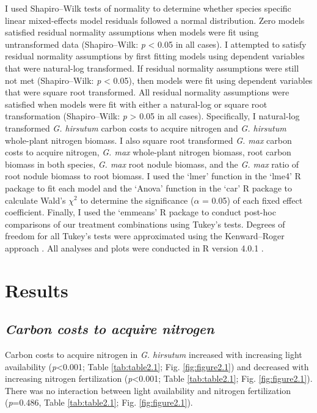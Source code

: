 I used Shapiro–Wilk tests of normality to determine whether species specific linear mixed-effects model residuals followed a normal distribution. Zero models satisfied residual normality assumptions when models were fit using untransformed data (Shapiro–Wilk: \textit{p} < 0.05 in all cases). I attempted to satisfy residual normality assumptions by first fitting models using dependent variables that were natural-log transformed. If residual normality assumptions were still not met (Shapiro–Wilk: \textit{p} < 0.05), then models were fit using dependent variables that were square root transformed. All residual normality assumptions were satisfied when models were fit with either a natural-log or square root transformation (Shapiro–Wilk: \textit{p} > 0.05 in all cases). Specifically, I natural-log transformed \textit{G. hirsutum} carbon costs to acquire nitrogen and \textit{G. hirsutum} whole-plant nitrogen biomass. I also square root transformed \textit{G. max} carbon costs to acquire nitrogen, \textit{G. max} whole-plant nitrogen biomass, root carbon biomass in both species, \textit{G. max} root nodule biomass, and the \textit{G. max} ratio of root nodule biomass to root biomass. I used the ‘lmer’ function in the ‘lme4’ R package  to fit each model and the ‘Anova’ function in the ‘car’ R package  to calculate Wald’s $\chi^{2}$ to determine the significance ($\alpha$ = 0.05) of each fixed effect coefficient. Finally, I used the ‘emmeans’ R package  to conduct post-hoc comparisons of our treatment combinations using Tukey’s tests. Degrees of freedom for all Tukey’s tests were approximated using the Kenward–Roger approach . All analyses and plots were conducted in R version 4.0.1 .

\section{Results}
\subsection{\textit{Carbon costs to acquire nitrogen}}
\noindent Carbon costs to acquire nitrogen in \textit{G. hirsutum} increased with increasing light availability (\textit{p}<0.001; Table \ref{tab:table2.1}; Fig. \ref{fig:figure2.1}) and decreased with increasing nitrogen fertilization (\textit{p}<0.001; Table \ref{tab:table2.1}; Fig. \ref{fig:figure2.1}). There was no interaction between light availability and nitrogen fertilization (\textit{p}=0.486, Table \ref{tab:table2.1}; Fig. \ref{fig:figure2.1}).

